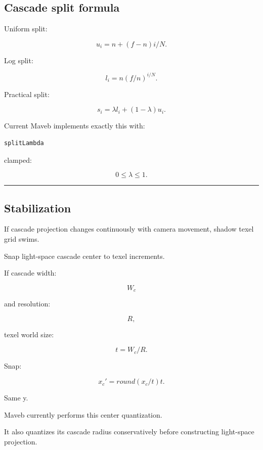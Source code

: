 \subsection{Cascade split formula}\label{04-visual-computing-ii-ch040-cascade-split-formula}

\hypertarget{04-visual-computing-ii-ch040-cascade-split-formula}{}

Uniform split:

\[
u_i=
n+(f-n)i/N.
\]

Log split:

\[
l_i=
n(f/n)^{i/N}.
\]

Practical split:

\[
\boxed{
s_i=
\lambda l_i+
(1-\lambda)u_i.
}
\]

Current Maveb implements exactly this with:

\begin{verbatim}
splitLambda
\end{verbatim}

clamped:

\[
0\le\lambda\le1.
\]

\begin{center}\rule{0.5\linewidth}{0.5pt}\end{center}

\subsection{Stabilization}\label{04-visual-computing-ii-ch040-stabilization}

\hypertarget{04-visual-computing-ii-ch040-stabilization}{}

If cascade projection changes continuously with camera movement, shadow texel grid swims.

Snap light-space cascade center to texel increments.

If cascade width:

\[
W_c
\]

and resolution:

\[
R,
\]

texel world size:

\[
t=
W_c/R.
\]

Snap:

\[
\boxed{
x_c'
=
round(x_c/t)t.
}
\]

Same y.

Maveb currently performs this center quantization.

It also quantizes its cascade radius conservatively before constructing light-space projection.

